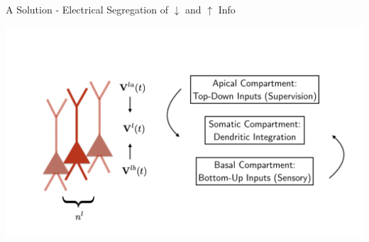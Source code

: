 \documentclass[dvipsnames, usenames]{beamer}
\begin{document}
\begin{frame}{A Solution - Electrical Segregation of $\downarrow$ and $\uparrow$ Info}

\centering 
\includegraphics[width=1.1\textwidth]{../figures/report/comp_sol_1}
\end{frame}
\end{document}
